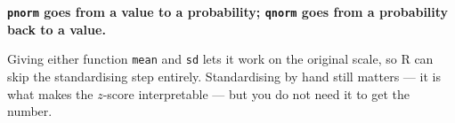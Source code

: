 \documentclass[a4paper,11pt]{article}
\begin{document}
\begin{keybox}
\textbf{\texttt{pnorm} goes from a value to a probability; \texttt{qnorm} goes
from a probability back to a value.}

Giving either function \texttt{mean} and \texttt{sd} lets it work on the
original scale, so R can skip the standardising step entirely. Standardising by
hand still matters --- it is what makes the $z$-score interpretable --- but you
do not need it to get the number.
\end{keybox}
\end{document}
